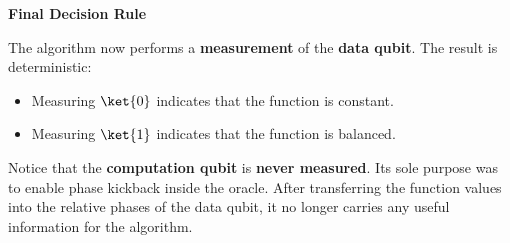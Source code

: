\highspace
\begin{flushleft}
    \textcolor{Green3}{ \textbf{Final Decision Rule}}
\end{flushleft}
The algorithm now performs a \textbf{measurement} of the \textbf{data qubit}. The result is deterministic:
\begin{itemize}
    \item Measuring $\ket{0}$ indicates that the function is constant.
    \item Measuring $\ket{1}$ indicates that the function is balanced.
\end{itemize}
Notice that the \textbf{computation qubit} is \textbf{never measured}. Its sole purpose was to enable phase kickback inside the oracle. After transferring the function values into the relative phases of the data qubit, it no longer carries any useful information for the algorithm.

